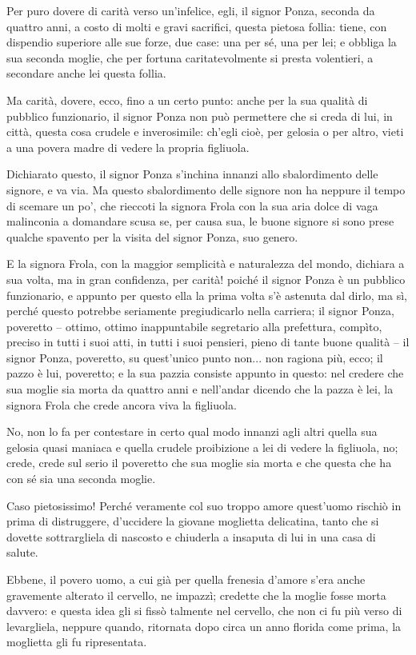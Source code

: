 \documentclass[12pt]{book}
\begin{document}
Per puro dovere di carità verso un’infelice, egli, il signor Ponza, seconda da quattro anni, a costo di molti e gravi sacrifici, questa pietosa follia: tiene, con dispendio superiore alle sue forze, due case: una per sé, una per lei; e obbliga la sua seconda moglie, che per fortuna caritatevolmente si presta volentieri, a secondare anche lei questa follia.

 Ma carità, dovere, ecco, fino a un certo punto: anche per la sua qualità di pubblico funzionario, il signor Ponza non può permettere che si creda di lui, in città, questa cosa crudele e inverosimile: ch’egli cioè, per gelosia o per altro, vieti a una povera madre di vedere la propria figliuola.


Dichiarato questo, il signor Ponza s’inchina innanzi allo sbalordimento delle signore, e va via. Ma questo sbalordimento delle signore non ha neppure il tempo di scemare un po’, che rieccoti la signora Frola con la sua aria dolce di vaga malinconia a domandare scusa se, per causa sua, le buone signore si sono prese qualche spavento per la visita del signor Ponza, suo genero.

E la signora Frola, con la maggior semplicità e naturalezza del mondo, dichiara a sua volta, ma in gran confidenza, per carità! poiché il signor Ponza è un pubblico funzionario, e appunto per questo ella la prima volta s’è astenuta dal dirlo, ma sì, perché questo potrebbe seriamente pregiudicarlo nella carriera; il signor Ponza, poveretto – ottimo, ottimo inappuntabile segretario alla prefettura, compìto, preciso in tutti i suoi atti, in tutti i suoi pensieri, pieno di tante buone qualità – il signor Ponza, poveretto, su quest’unico punto non... non ragiona più, ecco; il pazzo è lui, poveretto; e la sua pazzia consiste appunto in questo: nel credere che sua moglie sia morta da quattro anni e nell’andar dicendo che la pazza è lei, la signora Frola che crede ancora viva la figliuola.

 No, non lo fa per contestare in certo qual modo innanzi agli altri quella sua gelosia quasi maniaca e quella crudele proibizione a lei di vedere la figliuola, no; crede, crede sul serio il poveretto che sua moglie sia morta e che questa che ha con sé sia una seconda moglie.
 
  Caso pietosissimo! Perché veramente col suo troppo amore quest’uomo rischiò in prima di distruggere, d’uccidere la giovane moglietta delicatina, tanto che si dovette sottrargliela di nascosto e chiuderla a insaputa di lui in una casa di salute.

 Ebbene, il povero uomo, a cui già per quella frenesia d’amore s’era anche gravemente alterato il cervello, ne impazzì; credette che la moglie fosse morta davvero: e questa idea gli si fissò talmente nel cervello, che non ci fu più verso di levargliela, neppure quando, ritornata dopo circa un anno florida come prima, la moglietta gli fu ripresentata. 
 
\end{document}
